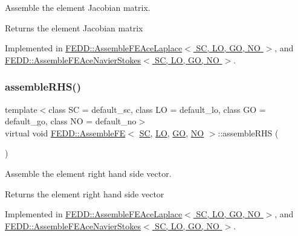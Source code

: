 Assemble the element Jacobian matrix. 

\begin{DoxyReturn}{Returns}
the element Jacobian matrix 
\end{DoxyReturn}


Implemented in \hyperlink{classFEDD_1_1AssembleFEAceLaplace_ac47ac062ba522289f4e9a5dd2df78503}{F\+E\+D\+D\+::\+Assemble\+F\+E\+Ace\+Laplace$<$ S\+C, L\+O, G\+O, N\+O $>$}, and \hyperlink{classFEDD_1_1AssembleFEAceNavierStokes_a1535786ac6b897da287e3e7e0aa60f61}{F\+E\+D\+D\+::\+Assemble\+F\+E\+Ace\+Navier\+Stokes$<$ S\+C, L\+O, G\+O, N\+O $>$}.

\mbox{\label{classFEDD_1_1AssembleFE_a43f18446faadb45bb4e2eae4f82ba9ba}} 
\subsubsection{\texorpdfstring{assemble\+R\+H\+S()}{assembleRHS()}}
{\footnotesize\ttfamily template$<$class SC  = default\+\_\+sc, class LO  = default\+\_\+lo, class GO  = default\+\_\+go, class NO  = default\+\_\+no$>$ \\
virtual void \hyperlink{classFEDD_1_1AssembleFE}{F\+E\+D\+D\+::\+Assemble\+FE}$<$ \hyperlink{fe__test__laplace_8cpp_a79c7e86a57edbb2a5a53242bcd04e41e}{SC}, \hyperlink{fe__test__laplace_8cpp_ad6a38c9f07d3fd633eefca5bccad8410}{LO}, \hyperlink{fe__test__laplace_8cpp_afa2946b509009b4f45eb04bd8c5b27d9}{GO}, \hyperlink{fe__test__laplace_8cpp_a5e24f37b28787429872b6ecb1d0417ce}{NO} $>$\+::assemble\+R\+HS (\begin{DoxyParamCaption}{ }\end{DoxyParamCaption})\hspace{0.3cm}{\ttfamily [pure virtual]}}



Assemble the element right hand side vector. 

\begin{DoxyReturn}{Returns}
the element right hand side vector 
\end{DoxyReturn}


Implemented in \hyperlink{classFEDD_1_1AssembleFEAceLaplace_a6d2759738ff7b596b4f132bf234c772a}{F\+E\+D\+D\+::\+Assemble\+F\+E\+Ace\+Laplace$<$ S\+C, L\+O, G\+O, N\+O $>$}, and \hyperlink{classFEDD_1_1AssembleFEAceNavierStokes_af42c6437fdac694ffbdccd12f8c581f2}{F\+E\+D\+D\+::\+Assemble\+F\+E\+Ace\+Navier\+Stokes$<$ S\+C, L\+O, G\+O, N\+O $>$}.

